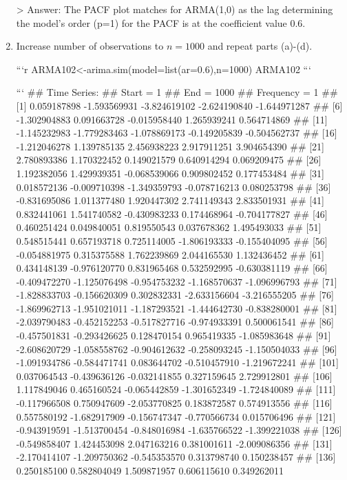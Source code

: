 \documentclass[
]{article}
\begin{document}
\begin{enumerate}[label=(\alph*)]
> Answer: The PACF plot matches for ARMA(1,0) as the lag determining the model's order (p=1) for the PACF is at the coefficient value 0.6.


\item Increase number of observations to $n=1000$ and repeat parts (a)-(d).


```r
ARMA102<-arima.sim(model=list(ar=0.6),n=1000)
ARMA102
```

```
## Time Series:
## Start = 1 
## End = 1000 
## Frequency = 1 
##    [1]  0.059187898 -1.593569931 -3.824619102 -2.624190840 -1.644971287
##    [6] -1.302904883  0.091663728 -0.015958440  1.265939241  0.564714869
##   [11] -1.145232983 -1.779283463 -1.078869173 -0.149205839 -0.504562737
##   [16] -1.212046278  1.139785135  2.456938223  2.917911251  3.904654390
##   [21]  2.780893386  1.170322452  0.149021579  0.640914294  0.069209475
##   [26]  1.192382056  1.429939351 -0.068539066  0.909802452  0.177453484
##   [31]  0.018572136 -0.009710398 -1.349359793 -0.078716213  0.080253798
##   [36] -0.831695086  1.011377480  1.920447302  2.741149343  2.833501931
##   [41]  0.832441061  1.541740582 -0.430983233  0.174468964 -0.704177827
##   [46]  0.460251424  0.049840051  0.819550543  0.037678362  1.495493033
##   [51]  0.548515441  0.657193718  0.725114005 -1.806193333 -0.155404095
##   [56] -0.054881975  0.315375588  1.762239869  2.044165530  1.132436452
##   [61]  0.434148139 -0.976120770  0.831965468  0.532592995 -0.630381119
##   [66] -0.409472270 -1.125076498 -0.954753232 -1.168570637 -1.096996793
##   [71] -1.828833703 -0.156620309  0.302832331 -2.633156604 -3.216555205
##   [76] -1.869962713 -1.951021011 -1.187293521 -1.444642730 -0.838280001
##   [81] -2.039790483 -0.452152253 -0.517827716 -0.974933391  0.500061541
##   [86] -0.457501831 -0.293426625  0.128470154  0.965419335 -1.085983648
##   [91] -2.608620729 -1.058558762 -0.904612632 -0.258093245 -1.150504033
##   [96] -1.091934786 -0.584471741  0.083644702 -0.510457910 -1.219672241
##  [101]  0.037064543 -0.439636126 -0.032141855  0.327159645  2.729912801
##  [106]  1.117849046  0.465160524 -0.065442859 -1.301652349 -1.724840089
##  [111] -0.117966508  0.750947609 -2.053770825  0.183872587  0.574913556
##  [116]  0.557580192 -1.682917909 -0.156747347 -0.770566734  0.015706496
##  [121] -0.943919591 -1.513700454 -0.848016984 -1.635766522 -1.399221038
##  [126] -0.549858407  1.424453098  2.047163216  0.381001611 -2.009086356
##  [131] -2.170414107 -1.209750362 -0.545353570  0.313798740  0.150238457
##  [136]  0.250185100  0.582804049  1.509871957  0.606115610  0.349262011

\end{enumerate}
\end{document}
